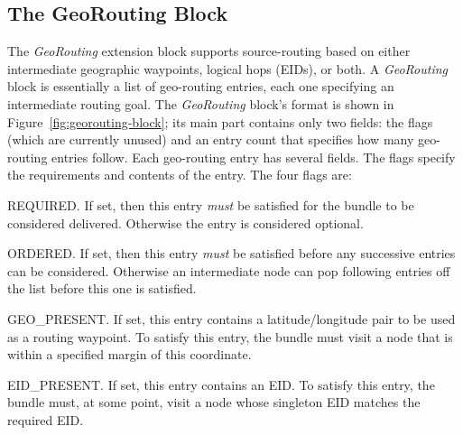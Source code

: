 \subsection{The GeoRouting Block}
\begin{sloppypar}
The {\em GeoRouting} extension block supports source-routing based on either intermediate geographic waypoints, logical hops (EIDs), or both.  A {\em GeoRouting} block is essentially a list of geo-routing entries, each one specifying an intermediate routing goal. The {\em GeoRouting} block's format is shown in Figure~\ref{fig:georouting-block}; its main part contains only two fields: the flags (which are currently unused) and an entry count that specifies how many geo-routing entries follow.  Each geo-routing entry has several fields.  The flags specify the requirements and contents of the entry. The four flags are:
\begin{description*}
  \item[REQUIRED.] If set, then this entry {\it must} be satisfied for the bundle to be considered delivered.  Otherwise the entry is considered optional.
  \item[ORDERED.] If set, then this entry {\it must} be satisfied before any successive entries can be considered.  Otherwise an intermediate node can pop following entries off the list before this one is satisfied.
  \item[GEO\_PRESENT.] If set, this entry contains a latitude/longitude pair to be used as a routing waypoint.  To satisfy this entry, the bundle must visit a node that is within a specified margin of this coordinate.
  \item[EID\_PRESENT.] If set, this entry contains an EID.  To satisfy this entry, the bundle must, at some point, visit a node whose singleton EID matches the required EID.
\end{description*}
\end{sloppypar}

